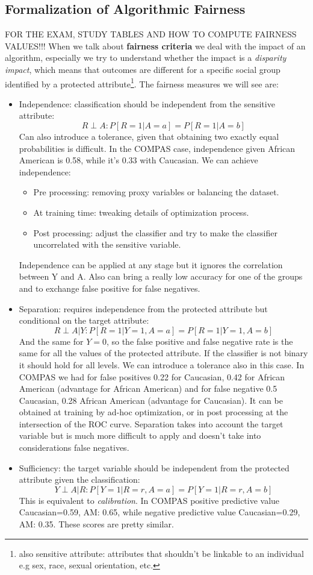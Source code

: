 \subsection{Formalization of Algorithmic Fairness}
FOR THE EXAM, STUDY TABLES AND HOW TO COMPUTE FAIRNESS VALUES!!!
When we talk about \textbf{fairness criteria} we deal with the impact of an algorithm, especially we try to understand whether the impact is a \textit{disparity impact}, which means that outcomes are different for a specific social group identified by a protected attribute\footnote{also sensitive attribute: attributes that shouldn't be linkable to an individual e.g sex, race, sexual orientation, etc.}.
The fairness measures we will see are:
\begin{itemize}
    \item Independence: classification should be independent from the sensitive attribute:
    $$
        R \perp A: P[R=1|A=a] = P[R=1|A=b]
    $$
    Can also introduce a tolerance, given that obtaining two exactly equal probabilities is difficult. In the COMPAS case, independence given African American is 0.58, while it's 0.33 with Caucasian. We can achieve independence:
    \begin{itemize}
        \item Pre processing: removing proxy variables or balancing the dataset.
        \item At training time: tweaking details of optimization process.
        \item Post processing: adjust the classifier and try to make the classifier uncorrelated with the sensitive variable.
    \end{itemize}
    Independence can be applied at any stage but it ignores the correlation between Y and A. Also can bring a really low accuracy for one of the groups and to exchange false positive for false negatives.
    \item Separation: requires independence from the protected attribute but conditional on the target attribute:
    $$
        R \perp A | Y: P[R=1|Y=1, A=a] = P[R=1|Y=1, A=b]
    $$
    And the same for $Y=0$, so the false positive and false negative rate is the same for all the values of the protected attribute. If the classifier is not binary it should hold for all levels. We can introduce a tolerance also in this case. 
    In COMPAS we had for false positives 0.22 for Caucasian, 0.42 for African American (advantage for African American) and for false negative 0.5 Caucasian, 0.28 African American (advantage for Caucasian). It can be obtained at training by ad-hoc optimization, or in post processing at the intersection of the ROC curve. Separation takes into account the target variable but is much more difficult to apply and doesn't take into considerations false negatives.
    \item Sufficiency: the target variable should be independent from the protected attribute given the classification:
    $$
        Y \perp A | R: P[Y=1|R=r, A=a] = P[Y=1|R=r, A=b]
    $$
    This is equivalent to \textit{calibration}. 
    In COMPAS positive predictive value Caucasian=0.59, AM: 0.65, while negative predictive value Caucasian=0.29, AM: 0.35. These scores are pretty similar.
\end{itemize}
